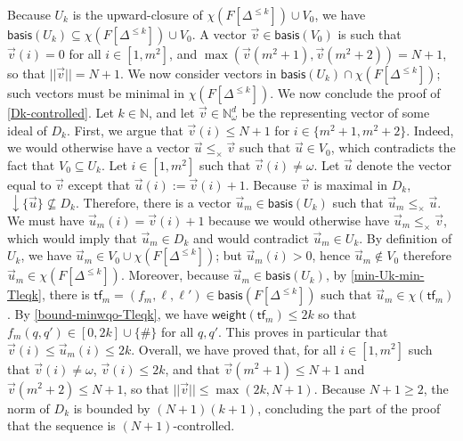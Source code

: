 \documentclass[10pt,a4paper]{article}
\let\mathbb\mathds
\renewcommand{\geq}{\geqslant}
\renewcommand{\leq}{\leqslant}
\newcommand{\nats}{\mathbb{N}}
\newcommand{\set}[1]{\{#1\}}
\newcommand{\nset}[2]{[#1,#2]}
\newcommand{\deff}{:=}
\newcommand{\norm}[1]{||#1||}
\newcommand{\transitions}{\Delta}
\newcommand*{\abuchistate}{\ell}
\newcommand*{\controlloc}{\abuchistate}
\let\olddownarrow\downarrow
\renewcommand*{\downarrow}{{\,\olddownarrow}}
\newcommand*{\downwardclosure}[1]{\downarrow #1}
\newcommand*{\dummysymb}{\#}
\newcommand*{\tfweight}[1]{\mathsf{weight}(#1)}
\newcommand*{\minwqo}[1]{\mathsf{basis}(#1)}
\newcommand*{\transfersof}[1]{F[#1]}
\newcommand*{\atf}{\mathsf{tf}}
\newcommand*{\omeganats}{\nats_{\omega}}
\newcommand*{\zerovectors}{V_0}
\newcommand{\Tleq}[1]{\transfersof{\transitions^{\leq #1}}}
\newcommand*{\leprod}{\leq_{\times}}
\newcommand*{\mapencoding}{\chi}
\newcommand*{\maxweight}{2}
\begin{document}
\begin{appendixproof}
	Because \(U_k\) is the upward-closure of \(\mapencoding(\Tleq{k}) \cup \zerovectors\), we have \(\minwqo{U_k} \subseteq {\mapencoding(\Tleq{k})} \cup {\zerovectors}\).
	A vector \(\vec{v} \in \minwqo{\zerovectors}\) is such that \(\vec{v}(i) = 0\) for all \(i \in \nset{1}{m^2}\), and \(\max(\vec{v}(m^2+1), \vec{v}(m^2+2)) =N+1\), so that \(\norm{\vec{v}} = N+1\).
	We now consider vectors in \(\minwqo{U_k} \cap {\mapencoding(\Tleq{k})}\); such vectors must be minimal in \({\mapencoding(\Tleq{k})}\).
	We now conclude the proof of \cref{Dk-controlled}.
	Let \(k \in \nats\), and let \(\vec{v} \in \omeganats^d\) be the representing vector of some ideal of \(D_k\).
	First, we argue that \(\vec{v}(i) \leq N+1\) for \(i \in \set{m^2+1, m^2+2}\).
	Indeed, we would otherwise have a vector \(\vec{u} \leprod \vec{v}\) such that \(\vec{u} \in \zerovectors\), which contradicts the fact that \(\zerovectors \subseteq U_k\).
	Let \(i \in \nset{1}{m^2}\) such that \(\vec{v}(i) \ne \omega\).
	Let \(\vec{u}\) denote the vector equal to \(\vec{v}\) except that \(\vec{u}(i) \deff \vec{v}(i) + 1\).
	Because \(\vec{v}\) is maximal in \(D_k\), \(\downwardclosure{\set{\vec{u}}} \nsubseteq D_k\).
	Therefore, there is a vector \(\vec{u}_m \in \minwqo{U_k}\) such that \(\vec{u}_m\leprod \vec{u}\).
	We must have \(\vec{u}_m(i) = \vec{v}(i)+1\) because we would otherwise have \(\vec{u}_m \leprod \vec{v}\), which would imply that \(\vec{u}_m \in D_k\) and would contradict \(\vec{u}_m \in U_k\).
	By definition of \(U_k\), we have \(\vec{u}_m \in \zerovectors \cup \mapencoding(\Tleq{k})\); but \(\vec{u}_m(i)>0\), hence \(\vec{u}_m \notin \zerovectors\) therefore \(\vec{u}_m \in \mapencoding(\Tleq{k})\).
	Moreover, because \(\vec{u}_m \in \minwqo{U_k}\), by \cref{min-Uk-min-Tleqk}, there is \(\atf_m = (f_m, \controlloc, \controlloc') \in \minwqo{\Tleq{k}}\) such that \(\vec{u}_m \in \mapencoding(\atf_m)\).
	By \cref{bound-minwqo-Tleqk}, we have \(\tfweight{\atf_m} \leq \maxweight k\) so that \(f_m(q,q') \in \nset{0}{\maxweight k} \cup \set{\dummysymb}\) for all \(q,q'\).
	This proves in particular that \(\vec{v}(i) \leq \vec{u}_m(i) \leq \maxweight k\).
	Overall, we have proved that, for all \(i \in \nset{1}{m^2}\) such that \(\vec{v}(i) \ne \omega\), \(\vec{v}(i) \leq \maxweight k\), and that \(\vec{v}(m^2+1) \leq N+1\) and \(\vec{v}(m^2+2) \leq N+1\), so that \(\norm{\vec{v}} \leq \max(\maxweight k, N+1)\).
	Because \(N+1 \geq 2\), the norm of \(D_k\) is bounded by \((N+1) (k+1)\), concluding the part of the proof that the sequence is \((N+1)\)-controlled.


\end{appendixproof}
\end{document}
